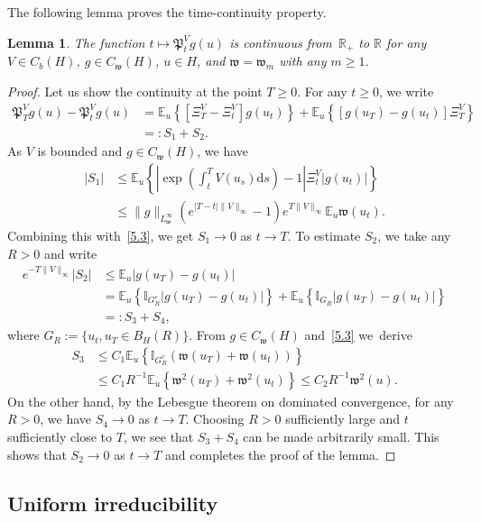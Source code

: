 \documentclass[10pt]{amsart}
\newtheorem{lemm}[theo]{Lemma}\newtheorem{prop}[theo]{Proposition}\newtheorem{coro}[theo]{Corollary}\newtheorem{conj}[theo]{Conjecture}
\theoremstyle{definition}\newtheorem{defi}[theo]{Definition}\newtheorem{rema}[theo]{Remark}\newtheorem{exam}[theo]{Example}\newtheorem{exem}[theo]{Example}\newtheorem{nota}[theo]{Notation}
\newcommand{\R}{{\mathbb R}}
\newcommand{\I}{{\mathbb I}}
\newcommand{\E}{{\mathbb E}}
\newcommand{\ty}{\infty}
\newcommand{\wwww}{{\mathfrak w}}
\newcommand{\PPPP}{{\mathfrak P}}
\newcommand{\dd}{\mathrm{d}}
\begin{document}
The following lemma proves the time-continuity property.

\begin{lemm}
The function $t\mapsto\PPPP^V_tg(u) $ is continuous from~$\R_+$ to $\R$ for any $V\in C_b(H)$, $ g\in C_\wwww(H) $, $u\in H$, and $\wwww=\wwww_m$ with any $m\ge1$.
\end{lemm}

\begin{proof}
Let us show the continuity at the point $T\ge0$.
For any $t\ge0$, we write
\begin{align*}
\PPPP^V_Tg(u)-\PPPP^V_tg(u)&=\E_u \left\{\left[\Xi^V_T-\Xi^V_t \right] g(u_t)\right\}+ \E_u\left\{\left[g(u_T)- g(u_t) \right] \Xi^V_T\right\}\nonumber\\&=: S_1+S_2.
\end{align*}
As $V$ is bounded and $ g\in C_\wwww(H) $, we have
\begin{align*}
|S_1|&\le \E_u \left\{\left|\exp\left(\int_t^TV(u_s)\dd s\right)- 1 \right| \Xi^V_t|g(u_t)|\right\}\nonumber\\&\le \|g\|_{L^\ty_\wwww} \left(e^{|T-t|\|V\|_\infty}-1\right)e^{T\|V\|_\infty} \E_u \wwww(u_t).
\end{align*}
Combining this with~\eqref{5.3}, we get $S_1\to0$ as $t\to T$. To estimate $S_2$, we take any~$R>0$ and write
\begin{align*}
e^{-T\|V\|_\infty} | S_2|&\le \E_u \left| g(u_T)- g(u_t) \right| \\&= \E_u \left\{\I_{G_R^c} \left| g(u_T)- g(u_t) \right| \right\}+ \E_u \left\{\I_{G_R} \left| g(u_T)- g(u_t) \right| \right\}\\&=: S_3+S_4,
\end{align*}
where $G_R:=\{u_t, u_T\in B_H(R)\}$. From $ g\in C_\wwww(H) $ and~\eqref{5.3} we~derive
\begin{align*}
S_3 &\le C_1 \E_u \left\{\I_{G_R^c} (\wwww(u_T)+ \wwww(u_t)) \right\} \\&\le C_1 R^{-1} \E_u \left\{ \wwww^2(u_T)+ \wwww^2(u_t) \right\} \le C_2 R^{-1} \wwww^2(u).
\end{align*}
On the other hand, by the Lebesgue theorem on dominated convergence, for any $R>0$, we have $S_4 \to 0$ as $t\to T$. Choosing $R>0$ sufficiently large and $t$ sufficiently close to $T$, we see that $S_3+S_4$ can be made arbitrarily small. This shows that $S_2\to0$ as $t\to T$ and completes the proof of the lemma.
\end{proof}

\subsection{Uniform irreducibility}\label{S:2.3}
\end{document}
